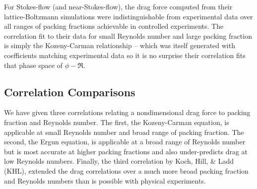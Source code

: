 For Stokes-flow (and near-Stokes-flow), the drag force computed from their lattice-Boltzmann simulations were indistinguishable from experimental data over all ranges of packing fractions achievable in controlled experiments. The correlation fit to their data for small Reynolds number and large packing fraction is simply the Kozeny-Carman relationship -- which was itself generated with coefficients matching experimental data so it is no surprise their correlation fits that phase space of $\phi-\Re$.

\subsection{Correlation Comparisons}
We have given three correlations relating a nondimensional drag force to packing fraction and Reynolds number. The first, the Kozeny-Carman equation, is applicable at small Reynolds number and broad range of packing fraction. The second, the Ergun equation, is applicable at a broad range of Reynolds number but is most accurate at higher packing fractions and also under-predicts drag at low Reynolds numbers. Finally, the third correlation by Koch, Hill, \& Ladd (KHL), extended the drag correlations over a much more broad packing fraction and Reynolds numbers than is possible with physical experiments. 

